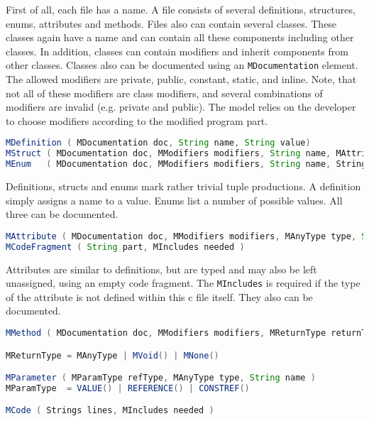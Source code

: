 \documentclass{report}
\begin{document}
First of all, each file has a name. A file consists of several definitions, structures, enums, attributes and methods. Files also can contain several classes. These classes again have a name and can contain all these components including other classes. In addition, classes can contain modifiers and inherit components from other classes. Classes also can be documented using an \texttt{MDocumentation} element.
The allowed modifiers are private, public, constant, static, and inline. Note, that not all of these modifiers are class modifiers, and several combinations of modifiers are invalid (e.g. private and public). The model relies on the developer to choose modifiers according to the modified program part.

\begin{lstlisting}[language=java, breaklines=true]
MDefinition ( MDocumentation doc, String name, String value)
MStruct ( MDocumentation doc, MModifiers modifiers, String name, MAttributes attributes )
MEnum   ( MDocumentation doc, MModifiers modifiers, String name, Strings values )
\end{lstlisting}

Definitions, structs and enums mark rather trivial tuple productions. A definition simply assigns a name to a value. %
Enums list a number of possible values. All three can be documented.

\begin{lstlisting}[language=java, breaklines=true]
MAttribute ( MDocumentation doc, MModifiers modifiers, MAnyType type, String name, MCodeFragment initial )
MCodeFragment ( String part, MIncludes needed )
\end{lstlisting}

Attributes are similar to definitions, but are typed and may also be left unassigned, using an empty code fragment. The \texttt{MIncludes} is required if the type of the attribute is not defined within this c file itself. They also can be documented.

\begin{lstlisting}[language=java, breaklines=true]
MMethod ( MDocumentation doc, MModifiers modifiers, MReturnType returnType, String name, MParameters parameter, MCode body )

MReturnType = MAnyType | MVoid() | MNone()

MParameter ( MParamType refType, MAnyType type, String name )
MParamType  = VALUE() | REFERENCE() | CONSTREF()

MCode ( Strings lines, MIncludes needed )
\end{lstlisting}
\end{document}
